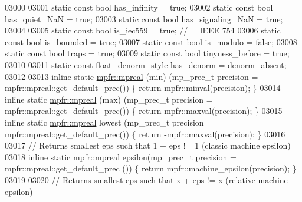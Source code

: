 \begin{DoxyCode}
{{{03000 
03001         \textcolor{keyword}{static} \textcolor{keyword}{const} \textcolor{keywordtype}{bool} has\_infinity      = \textcolor{keyword}{true};
03002         \textcolor{keyword}{static} \textcolor{keyword}{const} \textcolor{keywordtype}{bool} has\_quiet\_NaN     = \textcolor{keyword}{true};
03003         \textcolor{keyword}{static} \textcolor{keyword}{const} \textcolor{keywordtype}{bool} has\_signaling\_NaN = \textcolor{keyword}{true};
03004 
03005         \textcolor{keyword}{static} \textcolor{keyword}{const} \textcolor{keywordtype}{bool} is\_iec559         = \textcolor{keyword}{true};        \textcolor{comment}{// = IEEE 754}
03006         \textcolor{keyword}{static} \textcolor{keyword}{const} \textcolor{keywordtype}{bool} is\_bounded        = \textcolor{keyword}{true};
03007         \textcolor{keyword}{static} \textcolor{keyword}{const} \textcolor{keywordtype}{bool} is\_modulo         = \textcolor{keyword}{false};
03008         \textcolor{keyword}{static} \textcolor{keyword}{const} \textcolor{keywordtype}{bool} traps             = \textcolor{keyword}{true};
03009         \textcolor{keyword}{static} \textcolor{keyword}{const} \textcolor{keywordtype}{bool} tinyness\_before   = \textcolor{keyword}{true};
03010 
03011         \textcolor{keyword}{static} \textcolor{keyword}{const} float\_denorm\_style has\_denorm  = denorm\_absent;
03012 
03013         \textcolor{keyword}{inline} \textcolor{keyword}{static} \hyperlink{classmpfr_1_1mpreal}{mpfr::mpreal} (min)    (mp\_prec\_t precision = 
      mpfr::mpreal::get\_default\_prec()) \{  \textcolor{keywordflow}{return}  mpfr::minval(precision);  \}
03014         \textcolor{keyword}{inline} \textcolor{keyword}{static} \hyperlink{classmpfr_1_1mpreal}{mpfr::mpreal} (max)    (mp\_prec\_t precision = 
      mpfr::mpreal::get\_default\_prec()) \{  \textcolor{keywordflow}{return}  mpfr::maxval(precision);  \}
03015         \textcolor{keyword}{inline} \textcolor{keyword}{static} \hyperlink{classmpfr_1_1mpreal}{mpfr::mpreal} lowest   (mp\_prec\_t precision = 
      mpfr::mpreal::get\_default\_prec()) \{  \textcolor{keywordflow}{return} -mpfr::maxval(precision);  \}
03016 
03017         \textcolor{comment}{// Returns smallest eps such that 1 + eps != 1 (classic machine epsilon)}
03018         \textcolor{keyword}{inline} \textcolor{keyword}{static} \hyperlink{classmpfr_1_1mpreal}{mpfr::mpreal} epsilon(mp\_prec\_t precision = mpfr::mpreal::get\_default\_prec
      ()) \{  \textcolor{keywordflow}{return}  mpfr::machine\_epsilon(precision); \}
03019 
03020         \textcolor{comment}{// Returns smallest eps such that x + eps != x (relative machine epsilon)}
}}}
\end{DoxyCode}
